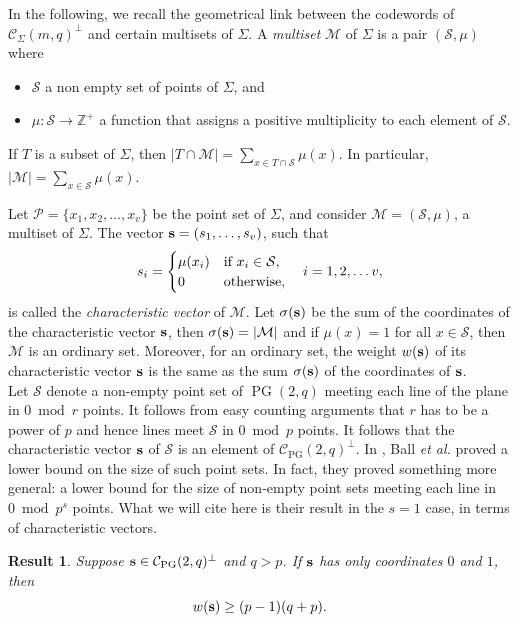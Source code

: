 \documentclass[12pt]{article}
\newcommand{\cC}{{\mathcal C}}
\newcommand{\cM}{{\mathcal M}}
\newcommand{\cS}{{\mathcal S}}
\newtheorem{result}[theorem]{Result}
\DeclareMathOperator{\PG}{{PG}}
\begin{document}
	In the following, we recall the geometrical link between the codewords of $\cC_{\Sigma}(m,q)^\perp$ and certain multisets of $\Sigma$. A \textit{multiset} $\cM$ of $\Sigma$ is a pair $(\cS, \mu)$ where
	\begin{itemize}
		\item [(1)] $\cS$ a non empty set of points of $\Sigma$, and 
		\item [(2)] $\mu \colon \cS \rightarrow \mathbb{Z}^+$ a function that assigns a positive multiplicity to each element of $\cS$.
	\end{itemize}
	If $T$ is a subset of $\Sigma$,  then $|T\cap \cM| = \sum_{x\in T\cap \cS} \mu(x)$. In particular, $|\cM|=\sum_{x\in \cS}\mu(x)$. 
	
	Let $\mathcal{P}=\{x_1,x_2,\ldots,x_v\}$ be the point set of $\Sigma$, and consider $\cM=(\cS,\mu)$, a multiset of $\Sigma$. The vector ${\bf s}=(s_1,\ldots,s_v)$, such that
	\begin{equation}
		s_i=
		\begin{cases}
			\mu(x_i) & \textnormal{if} \,\, x_i \in \cS, \\
			0 & \textnormal{otherwise},
		\end{cases}
		\quad i=1,2,\ldots v,
	\end{equation}
	is called the \textit{characteristic vector} of $\cM$. Let $\sigma({\bf s})$  be the sum of the coordinates of the characteristic vector ${\bf s}$, then $\sigma({ \bf s} ) = \vert \cM \vert$ and if $\mu(x)=1$ for all $x \in \cS$, then $\cM$ is an ordinary set. Moreover, for an ordinary set, the weight $w({\bf s})$ of its characteristic vector ${\bf s}$  is the same as the sum $\sigma({\bf s})$ of the coordinates of ${\bf s}$.\\
	Let $\cS$ denote a non-empty point set of $\PG(2,q)$ meeting  each line of the plane in $0 \bmod r$ points. It follows from easy counting arguments that $r$ has to be a power of $p$ and hence lines meet $\cS$ in $0 \bmod p$ points. It follows that the characteristic vector ${\bf s}$ of $\cS$ is an element of $\cC_{\PG}(2,q)^\perp$. In \cite[Theorem 2.1]{5nomi},  Ball \textit{et al.} proved a lower bound on the size of such point sets. In fact, they proved something more general: a lower bound for the size of non-empty point sets meeting each line in $0 \bmod p^s$ points. What we will cite here is their result in the $s=1$ case, in terms of characteristic vectors. 
	
	\begin{result}\label{result}
		Suppose ${\bf s}\in \cC_{\PG}(2,q)^\perp$ and $q>p$. If ${\bf s}$ has only coordinates $0$ and $1$, then \begin{equation} w ({\bf s}) \geq (p-1)(q+p).
		\end{equation}
	\end{result}
	
\end{document}
